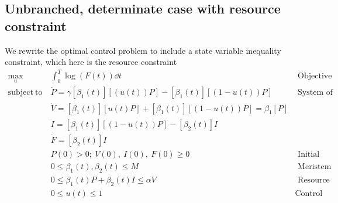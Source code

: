 \documentclass[12pt, oneside]{article}   	%
\begin{document}
\subsection*{Unbranched, determinate case with resource constraint}
We rewrite the optimal control problem to include a state variable inequality constraint, which here is the resource constraint
%
\begin{align}
\max_{u} &  \int_0^T  \log( F(t) ) \dd t & \mbox{ Objective function }   \nonumber \\
\mathrm{subject\ to\ } 
& \dot{P} =  \gamma [\beta_1(t)] [( u(t)) P ] - [\beta_1(t)] [(1 - u(t)) P ] & \mbox{ System of ODEs }   \nonumber \\
& \dot{V} = [\beta_1(t)] [ u(t) P]  + [\beta_1(t)] [(1 - u(t)) P] = \beta_1 [P] \nonumber \\ 
& \dot{I} = [\beta_1(t)] [( 1-u(t) ) P] - [\beta_2(t)] I  \\ 
& \dot{F} = [\beta_2(t)] I  \nonumber \\ 
& P(0) > 0;\ V(0),\ I(0),\ F(0) \geq 0 & \mbox{ Initial conditions}  \nonumber \\
& 0 \le \beta_1(t), \beta_2(t) \le M & \mbox{ Meristem constraint}  \nonumber \\
& 0 \le \beta_1(t) P + \beta_2(t) I \le \alpha V & \mbox{ Resource constraint} \nonumber \\
& 0 \leq u(t) \leq 1 & \mbox{Control constraint} \nonumber 
\end{align}
\end{document}
